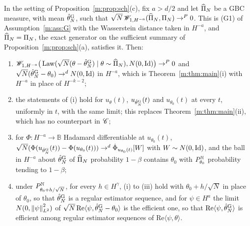 \begin{corollary}\label{m:cor:schtransfer}
In the setting of Proposition~\ref{m:prop:sch}(c), fix $a>d/2$ and let $\widehat\Pi_N$ be a GBC measure, with mean $\hat\theta^{\rm G}_N$, such that $\sqrt N\,\mathscr{W}_{1,H^{-a}}(\widehat\Pi_N,\Pi_N)\to^P0$. This is (G1) of Assumption~\ref{m:ass:G} with the Wasserstein distance taken in $H^{-a}$, and $\widehat\Pi_N=\Pi_N$, the exact generator on the sufficient summary of Proposition~\ref{m:prop:sch}(a), satisfies it. Then:
\begin{enumerate}[label=(\roman*),nosep,leftmargin=2.2em]
\item $\mathscr{W}_{1,H^{-a}}\big(\operatorname{Law}(\sqrt N(\theta-\hat\theta^{\rm G}_N)\mid\theta\sim\widehat\Pi_N),N(0,\operatorname{Id})\big)\to^P0$ and $\sqrt N(\hat\theta^{\rm G}_N-\theta_0)\to^dN(0,\operatorname{Id})$ in $H^{-a}$, which is Theorem~\ref{m:thm:main}(i) with $H^{-a}$ in place of $H^{-k-2}$;
\item the statements of (i) hold for $u_\theta(t)$, $u_{\hat\theta^{\rm G}_N}(t)$ and $u_{\theta_0}(t)$ at every $t$, uniformly in $t$, with the same limit; this replaces Theorem~\ref{m:thm:main}(ii), which has no counterpart in $\mathscr{C}$;
\item for $\Phi:H^{-a}\to\mathbb B$ Hadamard differentiable at $u_{\theta_0}(t)$, $\sqrt N(\Phi(u_{\hat\theta^{\rm G}_N}(t))-\Phi(u_{\theta_0}(t)))\to^d\dot\Phi_{u_{\theta_0}(t)}[W]$ with $W\sim N(0,\operatorname{Id})$, and the ball in $H^{-a}$ about $\hat\theta^{\rm G}_N$ of $\widehat\Pi_N$ probability $1-\beta$ contains $\theta_0$ with $P^{\mathbb{N}}_{\theta_0}$ probability tending to $1-\beta$;
\item under $P^{\mathbb{N}}_{\theta_0+h/\sqrt N}$, for every $h\in H^\gamma$, (i) to (iii) hold with $\theta_0+h/\sqrt N$ in place of $\theta_0$, so that $\hat\theta^{\rm G}_N$ is a regular estimator sequence, and for $\psi\in H^a$ the limit $N(0,\left\|\psi\right\|^2_{L^2})$ of $\sqrt N\,\mathrm{Re}\langle\psi,\hat\theta^{\rm G}_N-\theta_0\rangle$ is the efficient one, so that $\mathrm{Re}\langle\psi,\hat\theta^{\rm G}_N\rangle$ is efficient among regular estimator sequences of $\mathrm{Re}\langle\psi,\theta\rangle$.
\end{enumerate}
\end{corollary}

